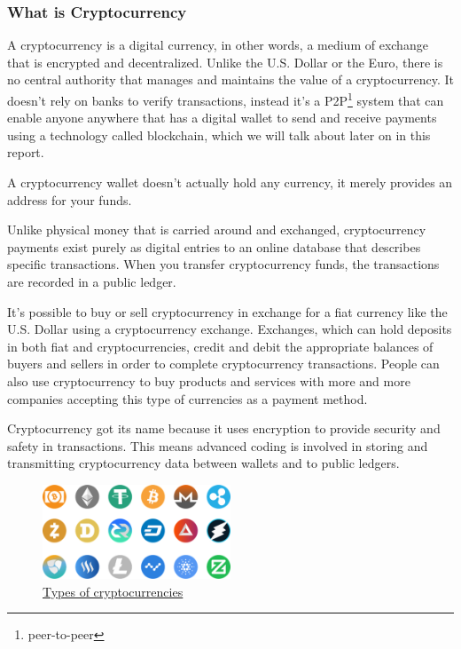 \documentclass{article}
\begin{document}
\subsubsection{What is Cryptocurrency}

A cryptocurrency is a digital currency, in other words, a medium of exchange that is encrypted and decentralized. Unlike the U.S. Dollar or the Euro, there is no central authority that manages and maintains the value of a cryptocurrency. It doesn't rely on banks to verify transactions, instead it's a P2P\footnote{peer-to-peer} system that can enable anyone anywhere that has a digital wallet to send and receive payments using a technology called blockchain, which we will talk about later on in this report. 

A cryptocurrency wallet doesn't actually hold any currency, it merely provides an address for your funds.

Unlike physical money that is carried around and exchanged, cryptocurrency payments exist purely as digital entries to an online database that describes specific transactions. When you transfer cryptocurrency funds, the transactions are recorded in a public ledger.

It's possible to buy or sell cryptocurrency in exchange for a fiat currency like the U.S. Dollar using a cryptocurrency exchange. Exchanges, which can hold deposits in both fiat and cryptocurrencies, credit and debit the appropriate balances of buyers and sellers in order to complete cryptocurrency transactions. People can also use cryptocurrency to buy  products and services with more and more companies accepting this type of currencies as a payment method.

Cryptocurrency got its name because it uses encryption to provide security and safety in transactions. This means advanced coding is involved in storing and transmitting cryptocurrency data between wallets and to public ledgers. 

\begin{figure}[H]
    \begin{center}
        \includegraphics[width=0.5\textwidth]{images/types_of_cryptocurrencies.png}
        \caption{\href{https://coinratecap.com/public/storage/posts/July2019/5aGA2VGhWLCMy27A49my.png}{\underline{Types of cryptocurrencies}}}
    \end{center}
\end{figure}
\end{document}
